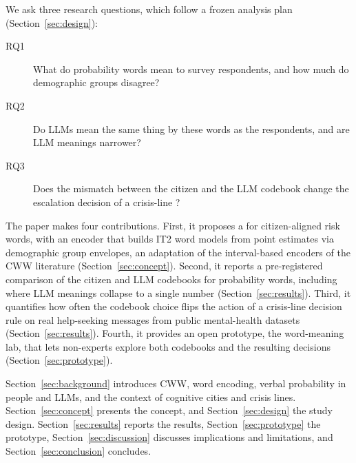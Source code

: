 We ask three research questions, which follow a frozen analysis plan (Section~\ref{sec:design}):
\begin{description}
\item[RQ1] What do probability words mean to survey respondents, and how much do demographic groups disagree?
\item[RQ2] Do LLMs mean the same thing by these words as the respondents, and are LLM meanings narrower?
\item[RQ3] Does the mismatch between the citizen and the LLM codebook change the escalation decision of a crisis-line
\Perc{}?
\end{description}

The paper makes four contributions.
First, it proposes a \Perc{} for citizen-aligned risk words, with an encoder that builds IT2 word models from point
estimates via demographic group envelopes, an adaptation of the interval-based encoders of the CWW literature
(Section~\ref{sec:concept}).
Second, it reports a pre-registered comparison of the citizen and LLM codebooks for \WoneNTerms{} probability words,
including where LLM meanings collapse to a single number (Section~\ref{sec:results}).
Third, it quantifies how often the codebook choice flips the action of a crisis-line decision rule on real help-seeking
messages from public mental-health datasets (Section~\ref{sec:results}).
Fourth, it provides an open prototype, the word-meaning lab, that lets non-experts explore both codebooks and the
resulting decisions (Section~\ref{sec:prototype}).

Section~\ref{sec:background} introduces CWW, word encoding, verbal probability in people and LLMs, and the context of
cognitive cities and crisis lines.
Section~\ref{sec:concept} presents the concept, and Section~\ref{sec:design} the study design.
Section~\ref{sec:results} reports the results, Section~\ref{sec:prototype} the prototype,
Section~\ref{sec:discussion} discusses implications and limitations, and Section~\ref{sec:conclusion} concludes.
